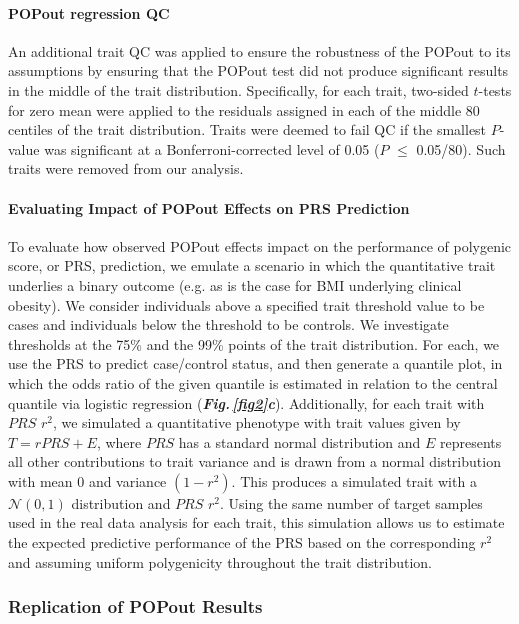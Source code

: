 \documentclass[12pt]{zHenriquesLab-StyleBioRxiv}
\newcommand\dref[2]{\normalsize{\textbf{\textit{Fig.\,\ref{#1}#2}}}\normalsize{}}
\begin{document}
{{\paragraph*{POPout regression QC}
An additional trait QC was applied to ensure the robustness of the
POPout to its assumptions by ensuring that the POPout test 
did not produce significant results in the middle of the trait distribution. 
Specifically, for each trait, two-sided $t$-tests for zero mean were
applied to the residuals assigned in each of the middle 80 centiles of
the trait distribution. Traits were deemed to fail QC if the smallest
$P$-value was significant at a Bonferroni-corrected level of 0.05 ($P$
$\le$ 0.05/80). Such traits were removed from our analysis.

\paragraph*{Evaluating Impact of POPout Effects on PRS Prediction} 
To evaluate how observed POPout effects impact on the performance of 
polygenic score, or PRS, prediction, we emulate a scenario in which the 
quantitative trait underlies a binary outcome (e.g. as is the case for BMI 
underlying clinical obesity). We consider individuals above a specified 
trait threshold value to be cases and individuals below the threshold to 
be controls. We investigate thresholds at the 75\% and the 99\% points of 
the trait distribution. For each, we use the PRS to predict case/control 
status, and then generate a quantile plot, in which the odds ratio of the 
given quantile is estimated in relation to the central quantile via logistic 
regression (\dref{fig2}{c}). Additionally, for each trait with $PRS$ $r^2$, we simulated 
a quantitative phenotype with trait values given by $T=r{PRS}+E$, where 
$PRS$ has a standard normal distribution and $E$ represents all other contributions 
to trait variance and is drawn from a normal distribution with mean 0 and 
variance $(1-r^2)$. This produces a simulated trait with a $\mathcal{N}(0,1)$ 
distribution and $PRS$ $r^2$. Using the same number of target samples 
used in the real data analysis for each trait, this simulation allows us to 
estimate the expected predictive performance of the PRS based on the 
corresponding $r^2$ and assuming uniform polygenicity throughout the 
trait distribution. 

\subsubsection*{Replication of POPout Results}
}}
\end{document}
